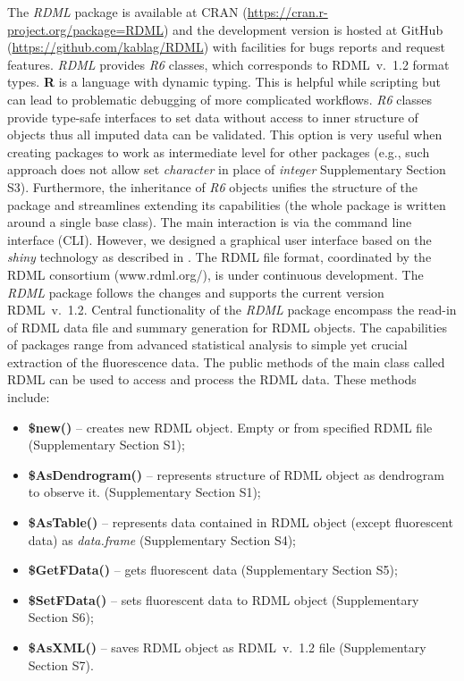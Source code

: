 \documentclass{bioinfo}
\begin{document}
The \textit{RDML} package is available at CRAN 
(\url{https://cran.r-project.org/package=RDML}) and the 
development version is hosted at GitHub (\url{https://github.com/kablag/RDML}) 
with facilities for bugs reports and request features. \textit{RDML} provides 
\emph{R6} classes, which corresponds to RDML~v.~1.2 format types. \textbf{R} 
is a language with dynamic typing. This is helpful while scripting but can lead 
to problematic debugging of more complicated workflows. \emph{R6} classes 
provide type-safe interfaces to set data without access to inner structure of 
objects thus all imputed data can be validated. This option is very useful when 
creating packages to work as intermediate level for other packages (e.g., such 
approach does not allow set \emph{character} in place of \emph{integer} 
Supplementary Section S3). Furthermore, the inheritance of \emph{R6} objects 
unifies the structure of the package and streamlines extending its capabilities 
(the whole package is written around a single base class). The main interaction 
is via the command line interface (CLI). However, we designed a graphical user 
interface based on the \textit{shiny} technology as described in 
\cite{roediger2015chippcr}. The RDML file format, coordinated by the RDML 
consortium (www.rdml.org/), is under continuous development. The \textit{RDML} 
package follows the changes and supports the current version RDML~v.~1.2. 
Central functionality of the \textit{RDML} package encompass the read-in of RDML 
data file and summary generation for RDML objects. The capabilities of packages 
range from advanced statistical analysis to simple yet crucial extraction of the 
fluorescence data. The public methods of the main class called RDML can be used 
to access and process the RDML data. These methods include:

\begin{itemize} 
  \item \textbf{\$new()} -- creates new RDML object. Empty or from specified RDML 
  file (Supplementary Section S1);
  \item \textbf{\$AsDendrogram()} -- represents 
  structure of RDML object as dendrogram to observe it. (Supplementary Section 
  S1);
  \item \textbf{\$AsTable()} -- represents data contained in RDML object (except 
  fluorescent data) as \textit{data.frame} (Supplementary Section S4);
  \item \textbf{\$GetFData()} -- gets fluorescent data (Supplementary Section S5);
  \item \textbf{\$SetFData()} -- sets fluorescent data to RDML object (Supplementary Section S6); 
  \item \textbf{\$AsXML()} -- saves RDML object as RDML~v.~1.2 file (Supplementary Section S7).
\end{itemize}
	
\end{document}
